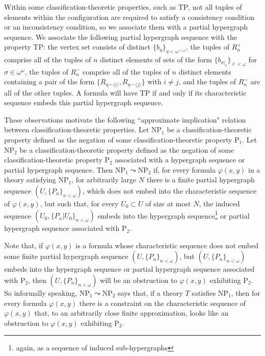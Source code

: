 \documentclass{amsart}
\theoremstyle{definition}
\theoremstyle{remark}
\numberwithin{equation}{section}
\begin{document}
\begin{tcolorbox}
\: Within some classification-theoretic properties, such as $\mathrm{TP}$, not all tuples of elements within the configuration are required to satisfy a consistency condition or an inconsistency condition, so we associate them with a partial hypergraph sequence.  We associate the following partial hypergraph sequence with the property $\mathrm{TP}$: the vertex set consists of distinct $\{b_{\eta}\}_{\eta< \omega^{< \omega}}$, the tuples of $R^{+}_{n}$ comprise all of the tuples of $n$ distinct elements of sets of the form $\{b_{\sigma|_{\ell}}\}_{\ell < \omega}$ for $\sigma \in \omega^{\omega}$, the tuples of $R^{-}_{n}$ comprise all of the tuples of $n$ distinct elements containing a pair of the form $\{R_{\eta \smallfrown \langle i\rangle}, R_{\eta \smallfrown \langle j\rangle} \}$ with $i \neq j$, and the tuples of $R^{\sim}_{n}$ are all of the other tuples. A formula will have $\mathrm{TP}$ if and only if its characteristic sequence embeds this partial hypergraph sequence.

\: These observations motivate the following ``approximate implication" relation between classification-theoretic properties. Let $\mathrm{NP}_{1}$ be a classification-theoretic property defined as the negation of some classification-theoretic property $\mathrm{P}_{1}$. Let $\mathrm{NP}_{2}$ be a classification-theoretic property defined as the negation of some classification-theoretic property $\mathrm{P}_{2}$ associated with a hypergraph sequence or partial hypergraph sequence. Then $\mathrm{NP}_{1} \leadsto \mathrm{NP}_{2}$ if, for every formula $\varphi(x, y)$ in a theory satisfying $\mathrm{NP}_{1}$, for arbitrarily large $N$ there is a finite partial hypergraph sequence $(U, \{P_{n}\}_{n < \omega})$, which does not embed into the characteristic sequence of $\varphi(x,y)$, but such that, for every $U_{0} \subset U$ of size at most $N$, the induced sequence $(U_{0}, \{P_{n}|U_{0}\}_{n < \omega})$ embeds into the hypergraph sequence\footnote{again, as a sequence of induced sub-hypergraphs} or partial hypergraph sequence associated with $\mathrm{P}_{2}$.

\: Note that, if $\varphi(x, y)$ is a formula whose characteristic sequence does not embed some finite partial hypergraph sequence $(U, \{P_{n}\}_{n < \omega})$, but $(U, \{P_{n}\}_{n < \omega})$ embeds into the hypergraph sequence or partial hypergraph sequence associated with $\mathrm{P}_{2}$, then $(U, \{P_{n}\}_{n < \omega})$ will be an obstruction to $\varphi(x, y)$ exhibiting $\mathrm{P}_{2}$. So informally speaking, $\mathrm{NP}_{1} \leadsto \mathrm{NP}_{2}$ says that, if a theory $T$ satisfies $\mathrm{NP}_{1}$, then for every formula $\varphi(x, y)$ there is a constraint on the characteristic sequence of $\varphi(x,y)$ that, to an arbitrarily close finite approximation, looks like an obstruction to $\varphi(x, y)$ exhibiting $\mathrm{P}_{2}$.


\end{tcolorbox}
\end{document}
